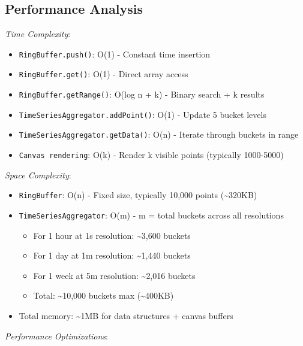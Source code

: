 \documentclass[11pt]{article}
\begin{document}
\subsection{Performance Analysis}
\label{sec:orge3f1cdd}

\emph{Time Complexity}:

\begin{itemize}
\item \texttt{RingBuffer.push()}: O(1) - Constant time insertion
\item \texttt{RingBuffer.get()}: O(1) - Direct array access
\item \texttt{RingBuffer.getRange()}: O(log n + k) - Binary search + k results
\item \texttt{TimeSeriesAggregator.addPoint()}: O(1) - Update 5 bucket levels
\item \texttt{TimeSeriesAggregator.getData()}: O(n) - Iterate through buckets in range
\item \texttt{Canvas rendering}: O(k) - Render k visible points (typically 1000-5000)
\end{itemize}

\emph{Space Complexity}:

\begin{itemize}
\item \texttt{RingBuffer}: O(n) - Fixed size, typically 10,000 points (\textasciitilde{}320KB)
\item \texttt{TimeSeriesAggregator}: O(m) - m = total buckets across all resolutions
\begin{itemize}
\item For 1 hour at 1s resolution: \textasciitilde{}3,600 buckets
\item For 1 day at 1m resolution: \textasciitilde{}1,440 buckets
\item For 1 week at 5m resolution: \textasciitilde{}2,016 buckets
\item Total: \textasciitilde{}10,000 buckets max (\textasciitilde{}400KB)
\end{itemize}
\item Total memory: \textasciitilde{}1MB for data structures + canvas buffers
\end{itemize}

\emph{Performance Optimizations}:
\end{document}
